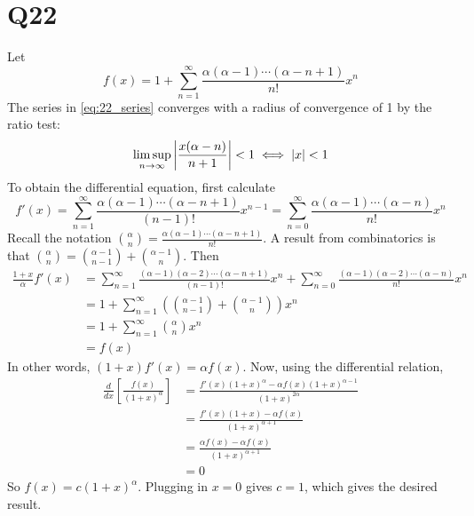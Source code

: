 \documentclass[12pt]{article}
\begin{document}
\section*{Q22}
Let 
\begin{equation} \label{eq:22_series}
  f(x) = 1 + \sum_{n = 1}^{\infty} \frac{\alpha (\alpha - 1) \cdots (\alpha - n + 1)}{n!} x^n
\end{equation}
The series in \eqref{eq:22_series} converges with a radius of convergence of 1 by the ratio test: 
$$\limsup_{n \rightarrow \infty} \left|\frac{x(\alpha - n)}{n + 1}\right| < 1 \iff \left|x\right| < 1$$
To obtain the differential equation, first calculate 
$$f'(x) = \sum_{n = 1}^{\infty} \frac{\alpha(\alpha - 1) \cdots (\alpha - n + 1)}{(n - 1)!} x^{n - 1} = \sum_{n = 0}^{\infty} \frac{\alpha(\alpha - 1) \cdots (\alpha - n)}{n!} x^n$$
Recall the notation $\binom{\alpha}{n} = \frac{\alpha(\alpha - 1) \cdots (\alpha - n + 1)}{n!}$.
A result from combinatorics is that $\binom{\alpha}{n} = \binom{\alpha - 1}{n - 1} + \binom{\alpha - 1}{n}$. 
Then 
\begin{align*}
  \frac{1 + x}{\alpha} f'(x) & = \sum_{n = 1}^{\infty} \frac{(\alpha - 1)(\alpha - 2) \cdots (\alpha - n + 1)}{(n - 1)!} x^n + \sum_{n = 0}^{\infty} \frac{(\alpha - 1) (\alpha - 2) \cdots (\alpha - n)}{n!} x^n  \\ 
                             & = 1 + \sum_{n = 1}^{\infty} (\binom{\alpha - 1}{n - 1} + \binom{\alpha - 1}{n}) x^n \\ 
                             & = 1 + \sum_{n = 1}^{\infty} \binom{\alpha}{n} x^n \\ 
                             & = f(x)
\end{align*}
In other words, $(1 + x)f'(x) = \alpha f(x)$. 
Now, using the differential relation,  
\begin{align*}
  \frac{d}{dx}\left[ \frac{f(x)}{(1 + x)^\alpha} \right] 
  & = \frac{f'(x) (1 + x)^\alpha - \alpha f(x) (1 + x)^{\alpha - 1}}{(1 + x)^{2\alpha}} \\ 
  & = \frac{f'(x) (1 + x) - \alpha f(x)}{(1 + x)^{\alpha + 1}} \\ 
  & = \frac{\alpha f(x) - \alpha f(x)}{(1 + x)^{\alpha + 1}} \\ 
  & = 0 
\end{align*}
So $f(x) = c(1 + x)^\alpha$. 
Plugging in $x = 0$ gives $c = 1$, which gives the desired result. 
\end{document}
